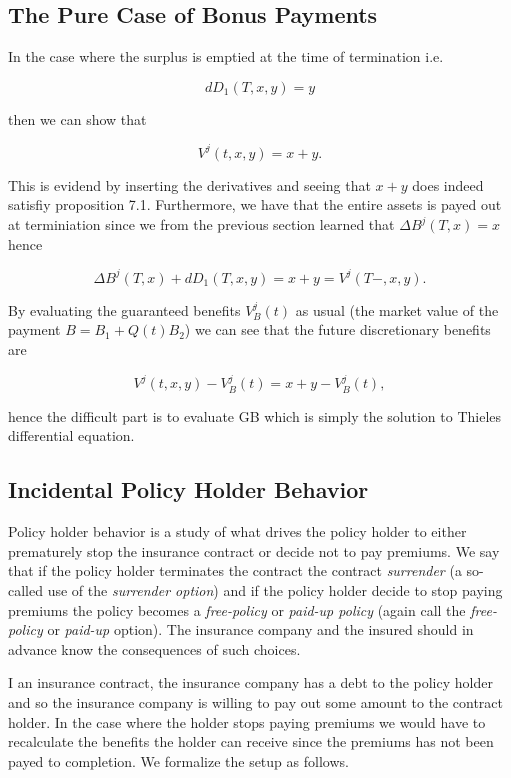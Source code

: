 \documentclass[a4paper,12pt,openany]{book}
\begin{document}
\hypertarget{the-pure-case-of-bonus-payments}{%
\subsection{The Pure Case of Bonus Payments}\label{the-pure-case-of-bonus-payments}}

In the case where the surplus is emptied at the time of termination i.e.

\[
dD_1(T,x,y)=y
\]

then we can show that

\[
V^j(t,x,y)=x+y.
\]

This is evidend by inserting the derivatives and seeing that \(x+y\) does indeed satisfiy proposition 7.1. Furthermore, we have that the entire assets is payed out at terminiation since we from the previous section learned that \(\Delta B^j(T,x)=x\) hence

\[
\Delta B^j(T,x)+dD_1(T,x,y)=x+y=V^j(T-,x,y).
\]

By evaluating the guaranteed benefits \(V_B^j(t)\) as usual (the market value of the payment \(B=B_1+Q(t)B_2\)) we can see that the future discretionary benefits are

\[
V^j(t,x,y)-V^j_B(t)=x+y-V_B^j(t),
\]

hence the difficult part is to evaluate GB which is simply the solution to Thieles differential equation.

\hypertarget{incidental-policy-holder-behavior}{%
\subsection{Incidental Policy Holder Behavior}\label{incidental-policy-holder-behavior}}

Policy holder behavior is a study of what drives the policy holder to either prematurely stop the insurance contract or decide not to pay premiums. We say that if the policy holder terminates the contract the contract \emph{surrender} (a so-called use of the \emph{surrender option}) and if the policy holder decide to stop paying premiums the policy becomes a \emph{free-policy} or \emph{paid-up policy} (again call the \emph{free-policy} or \emph{paid-up} option). The insurance company and the insured should in advance know the consequences of such choices.

I an insurance contract, the insurance company has a debt to the policy holder and so the insurance company is willing to pay out some amount to the contract holder. In the case where the holder stops paying premiums we would have to recalculate the benefits the holder can receive since the premiums has not been payed to completion. We formalize the setup as follows.
\end{document}
